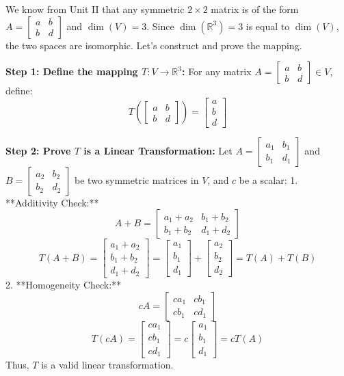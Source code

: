 \documentclass[11pt,a4paper]{article}
\begin{document}
\begin{solutionbox}
We know from Unit II that any symmetric $2 \times 2$ matrix is of the form $A = \begin{bmatrix} a & b \\ b & d \end{bmatrix}$ and $\dim(V) = 3$.
Since $\dim(\mathbb{R}^3) = 3$ is equal to $\dim(V)$, the two spaces are isomorphic. Let's construct and prove the mapping.

\textbf{Step 1: Define the mapping $T: V \to \mathbb{R}^3$:}
For any matrix $A = \begin{bmatrix} a & b \\ b & d \end{bmatrix} \in V$, define:
\[ T\left( \begin{bmatrix} a & b \\ b & d \end{bmatrix} \right) = \begin{bmatrix} a \\ b \\ d \end{bmatrix} \]

\textbf{Step 2: Prove $T$ is a Linear Transformation:}
Let $A = \begin{bmatrix} a_1 & b_1 \\ b_1 & d_1 \end{bmatrix}$ and $B = \begin{bmatrix} a_2 & b_2 \\ b_2 & d_2 \end{bmatrix}$ be two symmetric matrices in $V$, and $c$ be a scalar:
1. **Additivity Check:**
   \[ A + B = \begin{bmatrix} a_1+a_2 & b_1+b_2 \\ b_1+b_2 & d_1+d_2 \end{bmatrix} \]
   \[ T(A+B) = \begin{bmatrix} a_1+a_2 \\ b_1+b_2 \\ d_1+d_2 \end{bmatrix} = \begin{bmatrix} a_1 \\ b_1 \\ d_1 \end{bmatrix} + \begin{bmatrix} a_2 \\ b_2 \\ d_2 \end{bmatrix} = T(A) + T(B) \]
2. **Homogeneity Check:**
   \[ c A = \begin{bmatrix} c a_1 & c b_1 \\ c b_1 & c d_1 \end{bmatrix} \]
   \[ T(c A) = \begin{bmatrix} c a_1 \\ c b_1 \\ c d_1 \end{bmatrix} = c \begin{bmatrix} a_1 \\ b_1 \\ d_1 \end{bmatrix} = c T(A) \]
Thus, $T$ is a valid linear transformation.


\end{solutionbox}
\end{document}
